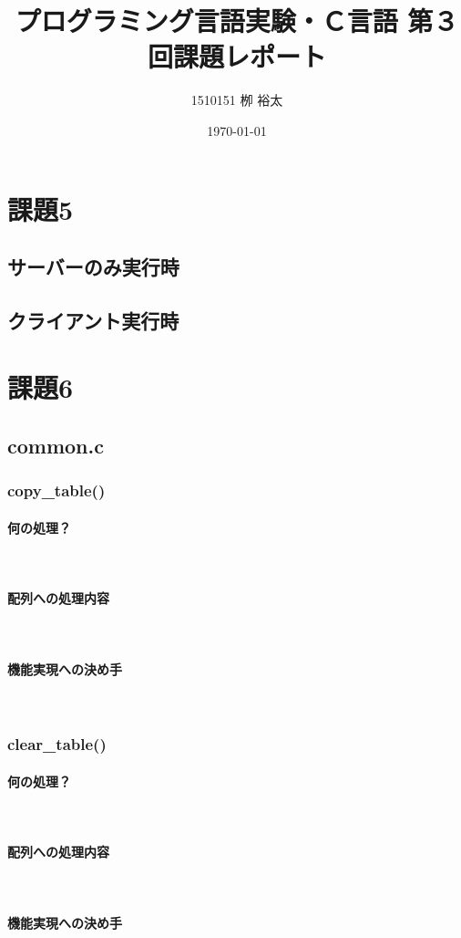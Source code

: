 \documentclass[11pt,a4paper, uplatex]{jsarticle}
\title{プログラミング言語実験・Ｃ言語 第３回課題レポート}
\author{1510151  栁 裕太}
\date{\today}
\begin{document}
\section{課題5}
%
\subsection{サーバーのみ実行時}
%
\subsection{クライアント実行時}
%
\section{課題6}
%
\subsection{common.c}
%
\subsubsection{copy\_table()}
\paragraph{何の処理？}\mbox{}\\
\paragraph{配列への処理内容}\mbox{}\\
\paragraph{機能実現への決め手}\mbox{}\\

%
\subsubsection{clear\_table()}
\paragraph{何の処理？}\mbox{}\\
\paragraph{配列への処理内容}\mbox{}\\
\paragraph{機能実現への決め手}\mbox{}\\
%
\end{document}
